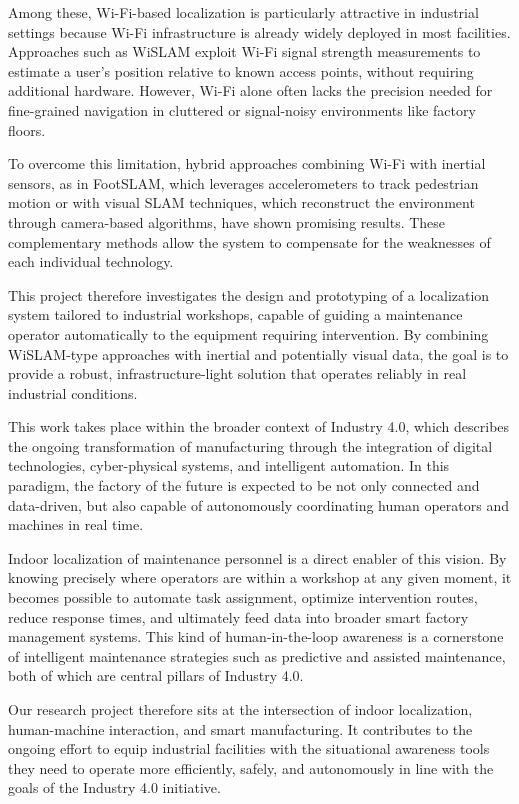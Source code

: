 \documentclass{ipgpmaster}
\begin{document}
Among these, Wi-Fi-based localization is particularly attractive in industrial settings because Wi-Fi infrastructure is already widely deployed in most facilities. Approaches such as WiSLAM exploit Wi-Fi signal strength measurements to estimate a user's position relative to known access points, without requiring additional hardware. However, Wi-Fi alone often lacks the precision needed for fine-grained navigation in cluttered or signal-noisy environments like factory floors.

To overcome this limitation, hybrid approaches combining Wi-Fi with inertial sensors, as in FootSLAM, which leverages accelerometers to track pedestrian motion or with visual SLAM techniques, which reconstruct the environment through camera-based algorithms, have shown promising results. These complementary methods allow the system to compensate for the weaknesses of each individual technology.

This project therefore investigates the design and prototyping of a localization system tailored to industrial workshops, capable of guiding a maintenance operator automatically to the equipment requiring intervention. By combining WiSLAM-type approaches with inertial and potentially visual data, the goal is to provide a robust, infrastructure-light solution that operates reliably in real industrial conditions.

This work takes place within the broader context of Industry 4.0, which describes the ongoing transformation of manufacturing through the integration of digital technologies, cyber-physical systems, and intelligent automation. In this paradigm, the factory of the future is expected to be not only connected and data-driven, but also capable of autonomously coordinating human operators and machines in real time.

Indoor localization of maintenance personnel is a direct enabler of this vision. By knowing precisely where operators are within a workshop at any given moment, it becomes possible to automate task assignment, optimize intervention routes, reduce response times, and ultimately feed data into broader smart factory management systems. This kind of human-in-the-loop awareness is a cornerstone of intelligent maintenance strategies such as predictive and assisted maintenance, both of which are central pillars of Industry 4.0.

Our research project therefore sits at the intersection of indoor localization, human-machine interaction, and smart manufacturing. It contributes to the ongoing effort to equip industrial facilities with the situational awareness tools they need to operate more efficiently, safely, and autonomously in line with the goals of the Industry 4.0 initiative.
\end{document}
